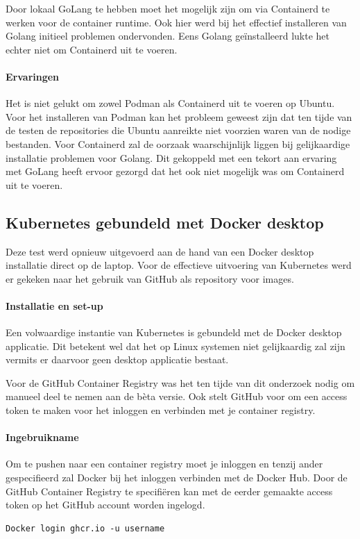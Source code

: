 Door lokaal GoLang te hebben moet het mogelijk zijn om via Containerd te werken voor de container runtime. Ook hier werd bij het effectief installeren van Golang initieel problemen ondervonden. Eens Golang geïnstalleerd lukte het echter niet om Containerd uit te voeren.


\paragraph{Ervaringen}
Het is niet gelukt om zowel Podman als Containerd uit te voeren op Ubuntu. Voor het installeren van Podman kan het probleem geweest zijn dat ten tijde van de testen de repositories die Ubuntu aanreikte niet voorzien waren van de nodige bestanden. Voor Containerd zal de oorzaak waarschijnlijk liggen bij gelijkaardige installatie problemen voor Golang. Dit gekoppeld met een tekort aan ervaring met GoLang heeft ervoor gezorgd dat het ook niet mogelijk was om Containerd uit te voeren.

\subsection{Kubernetes gebundeld met Docker desktop}
Deze test werd opnieuw uitgevoerd aan de hand van een Docker desktop installatie direct op de laptop. Voor de effectieve uitvoering van Kubernetes werd er gekeken naar het gebruik van GitHub als repository voor images.
\paragraph{Installatie en set-up}
Een volwaardige instantie van Kubernetes is gebundeld met de Docker desktop applicatie. Dit betekent wel dat het op Linux systemen niet gelijkaardig zal zijn vermits er daarvoor geen desktop applicatie bestaat.

Voor de GitHub Container Registry was het ten tijde van dit onderzoek nodig om manueel deel te nemen aan de bèta versie. Ook stelt GitHub voor om een access token te maken voor het inloggen en verbinden met je container registry.
\paragraph{Ingebruikname}
Om te pushen naar een container registry moet je inloggen en tenzij ander gespecifieerd zal Docker bij het inloggen verbinden met de Docker Hub. Door de GitHub Container Registry te specifiëren kan met de eerder gemaakte access token op het GitHub account worden ingelogd.
\begin{verbatim}
Docker login ghcr.io -u username
\end{verbatim}

